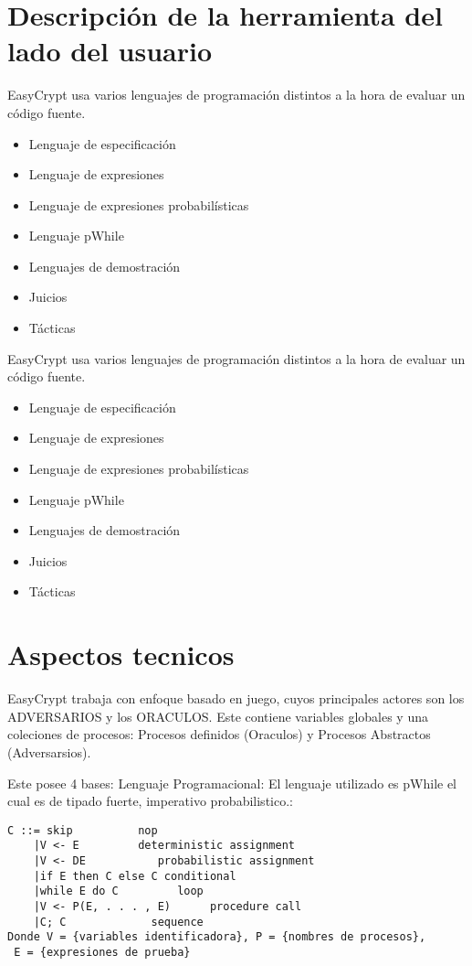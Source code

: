 \documentclass[runningheads,a4paper]{llncs}
\begin{document}
\section{Descripción de la herramienta del lado del usuario}

EasyCrypt usa varios lenguajes de programación distintos a la hora de evaluar un código fuente. 

\begin{itemize}
	\item Lenguaje de especificación
	\item Lenguaje de expresiones
	\item Lenguaje de expresiones probabilísticas
	\item Lenguaje pWhile
	\item Lenguajes de demostración
	\item Juicios
	\item Tácticas
\end{itemize}

EasyCrypt usa varios lenguajes de programación distintos a la hora de evaluar un código fuente. 

\begin{itemize}
	\item Lenguaje de especificación
	\item Lenguaje de expresiones
	\item Lenguaje de expresiones probabilísticas
	\item Lenguaje pWhile
	\item Lenguajes de demostración
	\item Juicios
	\item Tácticas
\end{itemize}

\section{Aspectos tecnicos}
EasyCrypt trabaja con enfoque basado en juego, cuyos principales actores son los ADVERSARIOS y los ORACULOS. Este contiene variables globales y una coleciones de procesos: Procesos definidos (Oraculos) y Procesos Abstractos (Adversarsios).

Este posee 4 bases:
Lenguaje Programacional:
El lenguaje utilizado es pWhile el cual es de tipado fuerte, imperativo probabilistico.:

\begin{Verbatim}
C ::= skip		 	nop
	|V <- E		    deterministic assignment
	|V <- DE		   probabilistic assignment
	|if E then C else C	conditional
	|while E do C	      loop
	|V <- P(E, . . . , E)      procedure call
	|C; C		      sequence
Donde V = {variables identificadora}, P = {nombres de procesos},
 E = {expresiones de prueba}
\end{Verbatim}
\end{document}
